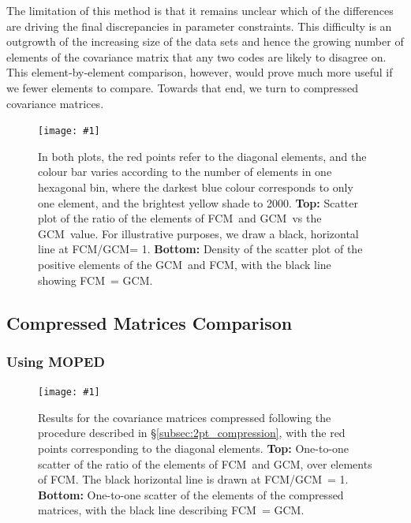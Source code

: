 \documentclass[twocolumn]{\docclass}
\newcommand{\sfig}[2]{
	\texttt{[image: \#1]}
}
\newcommand{\Sfig}[2]{
	\begin{figure}[thbp]
		\sfig{../figures/#1.pdf}{\columnwidth}
		\caption{{\small #2}}
		\label{fig:#1}
	\end{figure}
}
\newcommand{\rssec}[1]{\S\ref{subsec:#1}}
\newcommand\full{FCM}
\newcommand\gaussian{GCM}
\begin{document}
	The limitation of this method is that it remains unclear which of the differences are driving the final discrepancies in parameter constraints. This difficulty is an outgrowth of the increasing size of the data sets and hence the growing number of elements of the covariance matrix that any two codes are likely to disagree on. This element-by-element comparison, however, would prove much more useful if we fewer elements to compare. Towards that end, we turn to compressed covariance matrices.
	
	\Sfig{Y1-scatter}{In both plots, the red points refer to the diagonal elements, and the colour bar varies according to the number of elements in one hexagonal bin, where the darkest blue colour corresponds to only one element, and the brightest yellow shade to 2000. \textbf{Top:} Scatter plot of the ratio of the elements of \full\ and \gaussian\ vs the \gaussian\ value. For illustrative purposes, we draw a black, horizontal line at \full/\gaussian = 1. \textbf{Bottom:} Density of the scatter plot of the positive elements of the \gaussian\ and \full, with the black line showing \full\ = \gaussian.}
	
	\subsection{Compressed Matrices Comparison}
	\label{subsec:compare_compressed}
	
	\subsubsection{Using MOPED}
	
	\begin{figure}[b]
		\sfig{Comp2pt-scatter}{0.85\columnwidth}
		\caption{{\small Results for the covariance matrices compressed following the procedure described in \rssec{2pt_compression}, with the red points corresponding to the diagonal elements.
				\textbf{Top:}  One-to-one scatter of the ratio of the elements of \full\ and \gaussian, over elements of \full. The black horizontal line is drawn at \full/\gaussian\ = 1.
				\textbf{Bottom:}  One-to-one scatter of the elements of the compressed matrices, with the black line describing \full\ = \gaussian.}}
		\label{fig:Comp2pt-scatter}
	\end{figure}
	
\end{document}
